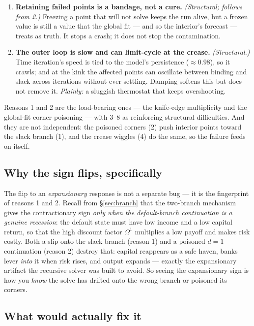 \documentclass[11pt]{article}
\begin{document}
\begin{enumerate}
\item \textbf{Retaining failed points is a bandage, not a cure.}
      \emph{(Structural; follows from 2.)} Freezing a point that will not
      solve keeps the run alive, but a frozen value is still a value that the
      global fit --- and so the interior's forecast --- treats as truth. It
      stops a crash; it does not stop the contamination.

\item \textbf{The outer loop is slow and can limit-cycle at the crease.}
      \emph{(Structural.)} Time iteration's speed is tied to the model's
      persistence ($\approx0.98$), so it crawls; and at the kink the affected
      points can oscillate between binding and slack across iterations without
      ever settling. Damping softens this but does not remove it.
      \emph{Plainly:} a sluggish thermostat that keeps overshooting.
\end{enumerate}

\noindent Reasons 1 and 2 are the load-bearing ones --- the knife-edge
multiplicity and the global-fit corner poisoning --- with 3--8 as reinforcing
structural difficulties. And they are not independent: the poisoned corners
(2) push interior points toward the slack branch (1), and the crease wiggles
(4) do the same, so the failure feeds on itself.

\subsection{Why the sign flips, specifically}

The flip to an \emph{expansionary} response is not a separate bug --- it is
the fingerprint of reasons 1 and 2. Recall from \S\ref{sec:branch} that the
two-branch mechanism gives the contractionary sign \emph{only when the
default-branch continuation is a genuine recession}: the default state must
have low income and a low capital return, so that the high discount factor
$\Omega^1$ multiplies a low payoff and makes risk costly. Both a slip onto
the slack branch (reason 1) and a poisoned $d=1$ continuation (reason 2)
destroy that: capital reappears as a safe haven, banks lever \emph{into} it
when risk rises, and output expands --- exactly the expansionary artifact the
recursive solver was built to avoid. So seeing the expansionary
sign is how you \emph{know} the solve has drifted onto the wrong branch or
poisoned its corners.

\subsection{What would actually fix it}
\end{document}
